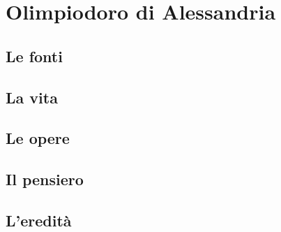\chapter{Olimpiodoro di Alessandria}

\section{Le fonti}

\section{La vita}

\section{Le opere}

\section{Il pensiero}

\section{L'eredità}
